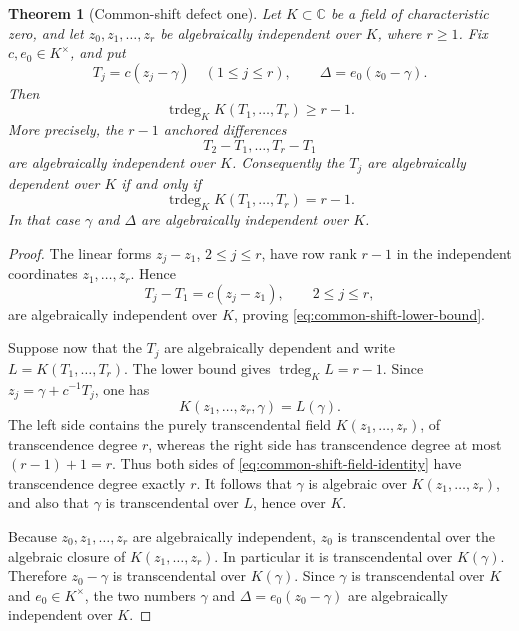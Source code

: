 \documentclass[11pt]{article}
\newtheorem{theorem}{Theorem}[section]
\theoremstyle{definition}
\theoremstyle{remark}
\newcommand{\C}{\mathbb C}
\newcommand{\trdeg}{\operatorname{trdeg}}
\begin{document}
\begin{theorem}[Common-shift defect one]
\label{thm:common-shift-defect}
Let \(K\subset\C\) be a field of characteristic zero, and let
\(z_0,z_1,\ldots,z_r\) be algebraically independent over \(K\), where
\(r\geq1\).  Fix \(c,e_0\in K^\times\), and put
\begin{equation}\label{eq:common-shift-coordinates}
 T_j=c(z_j-\gamma)\quad(1\leq j\leq r),
 \qquad
 \Delta=e_0(z_0-\gamma).
\end{equation}
Then
\begin{equation}\label{eq:common-shift-lower-bound}
 \trdeg_K K(T_1,\ldots,T_r)\geq r-1.
\end{equation}
More precisely, the \(r-1\) anchored differences
\[
 T_2-T_1,\ldots,T_r-T_1
\]
are algebraically independent over \(K\).  Consequently the \(T_j\) are
algebraically dependent over \(K\) if and only if
\[
 \trdeg_K K(T_1,\ldots,T_r)=r-1.
\]
In that case \(\gamma\) and \(\Delta\) are algebraically independent over
\(K\).
\end{theorem}

\begin{proof}
The linear forms \(z_j-z_1\), \(2\leq j\leq r\), have row rank \(r-1\)
in the independent coordinates \(z_1,\ldots,z_r\).  Hence
\[
 T_j-T_1=c(z_j-z_1),\qquad 2\leq j\leq r,
\]
are algebraically independent over \(K\), proving
\eqref{eq:common-shift-lower-bound}.

Suppose now that the \(T_j\) are algebraically dependent and write
\(L=K(T_1,\ldots,T_r)\).  The lower bound gives
\(\trdeg_K L=r-1\).  Since \(z_j=\gamma+c^{-1}T_j\), one has
\begin{equation}\label{eq:common-shift-field-identity}
 K(z_1,\ldots,z_r,\gamma)=L(\gamma).
\end{equation}
The left side contains the purely transcendental field
\(K(z_1,\ldots,z_r)\), of transcendence degree \(r\), whereas the right
side has transcendence degree at most \((r-1)+1=r\).  Thus both sides of
\eqref{eq:common-shift-field-identity} have transcendence degree exactly
\(r\).  It follows that \(\gamma\) is algebraic over
\(K(z_1,\ldots,z_r)\), and also that \(\gamma\) is transcendental over
\(L\), hence over \(K\).

Because \(z_0,z_1,\ldots,z_r\) are algebraically independent, \(z_0\) is
transcendental over the algebraic closure of
\(K(z_1,\ldots,z_r)\).  In particular it is transcendental over
\(K(\gamma)\).  Therefore \(z_0-\gamma\) is transcendental over
\(K(\gamma)\).  Since \(\gamma\) is transcendental over \(K\) and
\(e_0\in K^\times\), the two numbers
\(\gamma\) and \(\Delta=e_0(z_0-\gamma)\) are algebraically independent
over \(K\).
\end{proof}
\end{document}
